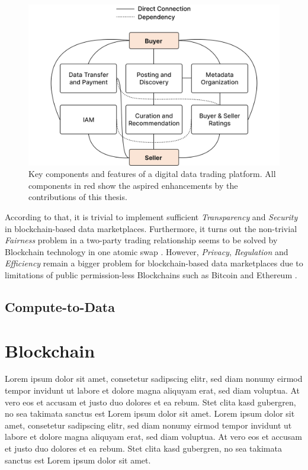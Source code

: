 \begin{figure}[!htb]
    \centering
    \includegraphics[width=13cm]{images/components-clean.png}
    \caption[Key components and features of a digital data trading platform]{Key components and features of a digital data trading platform. All components in red show the aspired enhancements by the contributions of this thesis.}
    \label{fig:components}
\end{figure}

According to that, it is trivial to implement sufficient \emph{Transparency} and \emph{Security} in blockchain-based data marketplaces. Furthermore, it turns out the non-trivial \emph{Fairness} problem in a two-party trading relationship seems to be solved by Blockchain technology in one atomic swap \cite{dziembowskiFairSwapHowFairly2018,liZKCPlusOptimizedFairexchange2021}. However, \emph{Privacy}, \emph{Regulation} and \emph{Efficiency} remain a bigger problem for blockchain-based data marketplaces due to limitations of public permission-less Blockchains such as Bitcoin \cite{nakamotoBitcoinPeertoPeerElectronic} and Ethereum \cite{buterinNEXTGENERATIONSMART}.

\subsection{Compute-to-Data}
\label{subsec:c2d}

\section{Blockchain}
\label{sec:blockchain}

Lorem ipsum dolor sit amet, consetetur sadipscing elitr, sed diam nonumy eirmod tempor invidunt ut labore et dolore magna aliquyam erat, sed diam voluptua. At vero eos et accusam et justo duo dolores et ea rebum. Stet clita kasd gubergren, no sea takimata sanctus est Lorem ipsum dolor sit amet. Lorem ipsum dolor sit amet, consetetur sadipscing elitr, sed diam nonumy eirmod tempor invidunt ut labore et dolore magna aliquyam erat, sed diam voluptua. At vero eos et accusam et justo duo dolores et ea rebum. Stet clita kasd gubergren, no sea takimata sanctus est Lorem ipsum dolor sit amet.

